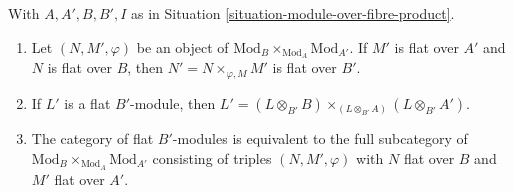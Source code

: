 \begin{lemma}
\label{lemma-flat-module-over-fibre-product}
With $A, A', B, B', I$ as in
Situation \ref{situation-module-over-fibre-product}.
\begin{enumerate}
\item Let $(N, M', \varphi)$ be an object of
$\text{Mod}_B \times_{\text{Mod}_A} \text{Mod}_{A'}$.
If $M'$ is flat over $A'$ and $N$ is flat over $B$, then
$N' = N \times_{\varphi, M} M'$ is flat over $B'$.
\item If $L'$ is a flat $B'$-module, then
$L' = (L \otimes_{B'} B) \times_{(L \otimes_{B'} A)} (L \otimes_{B'} A')$.
\item The category of flat $B'$-modules is equivalent to the
full subcategory of $\text{Mod}_B \times_{\text{Mod}_A} \text{Mod}_{A'}$
consisting of triples
$(N, M', \varphi)$ with $N$ flat over $B$ and $M'$ flat over $A'$.
\end{enumerate}
\end{lemma}

